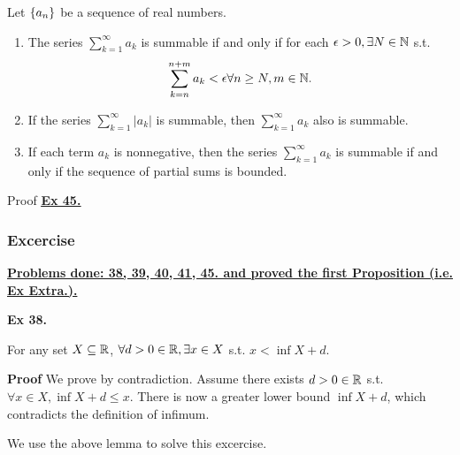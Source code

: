 \begin{prop}
    Let $\left\{a_n\right\}$ be a sequence of real numbers.
    \begin{enumerate}[label=(\roman*)]
        \item The series $\sum_{k=1}^\infty a_k$ is summable if and only if for each $\epsilon > 0, \exists N\in\mathbb{N}$ s.t.
        \[ \sum_{k=n}^{n+m} a_k < \epsilon \forall n \ge N, m \in \mathbb{N}.\]
        \item If the series $\sum_{k=1}^\infty |a_k|$ is summable, then $\sum_{k=1}^\infty a_k$ also is summable.
        \item If each term $a_k$ is nonnegative, then the series $\sum_{k=1}^\infty a_k$ is summable if and only if the sequence of partial sums is bounded.
    \end{enumerate}
    Proof \hyperref[ex:45]{\underline{\textbf{Ex 45.}}}
\end{prop}

\subsubsection{Excercise}
\underline{\textbf{Problems done: 38, 39, 40, 41, 45. and proved the first Proposition (i.e. Ex Extra.).}}
\bigskip

\noindent \textbf{Ex 38.}
\begin{lem}
    For any set $X\subseteq \mathbb{R}$, $\forall d > 0 \in \mathbb{R}, \exists x \in X$ s.t. $x < \inf X + d$.
\end{lem}

\textbf{Proof} We prove by contradiction. Assume there exists $d > 0 \in \mathbb{R}$ s.t. 
$\forall x \in X, \inf X + d \leq x$. There is now a greater lower bound $\inf X + d$, which contradicts the definition of infimum.

\bigskip

\noindent We use the above lemma to solve this excercise.

